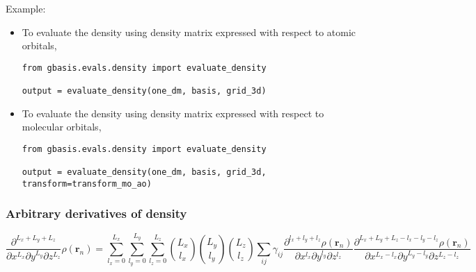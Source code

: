 \documentclass[letterpaper]{article}
\begin{document}
Example:
\begin{itemize}
\item To evaluate the density using density matrix expressed with respect to
  atomic orbitals,
  \begin{lstlisting}[xleftmargin=-25pt]
from gbasis.evals.density import evaluate_density

output = evaluate_density(one_dm, basis, grid_3d)
\end{lstlisting}
\item To evaluate the density using density matrix expressed with respect to
  molecular orbitals,
  \begin{lstlisting}[xleftmargin=-25pt]
from gbasis.evals.density import evaluate_density

output = evaluate_density(one_dm, basis, grid_3d, transform=transform_mo_ao)
\end{lstlisting}
\end{itemize}
\subsubsection{Arbitrary derivatives of density}
\begin{equation}
  \frac{\partial^{L_x + L_y + L_z}}{\partial x^{L_x} \partial y^{L_y} \partial z^{L_z}}
  \rho(\mathbf{r}_n)
  =
  \sum_{l_x=0}^{L_x} \sum_{l_y=0}^{L_y} \sum_{l_z=0}^{L_z}
  \binom{L_x}{l_x} \binom{L_y}{l_y} \binom{L_z}{l_z}
  \sum_{ij} \gamma_{ij}
  \frac{\partial^{l_x + l_y + l_z} \rho(\mathbf{r}_n)}{\partial x^{l_x} \partial y^{l_y} \partial z^{l_z}}
  \frac{
    \partial^{L_x + L_y + L_z - l_x - l_y - l_z} \rho(\mathbf{r}_n)
  }{
    \partial x^{L_x - l_x} \partial y^{L_y - l_y} \partial z^{L_z - l_z}
  }
\end{equation}
\end{document}
